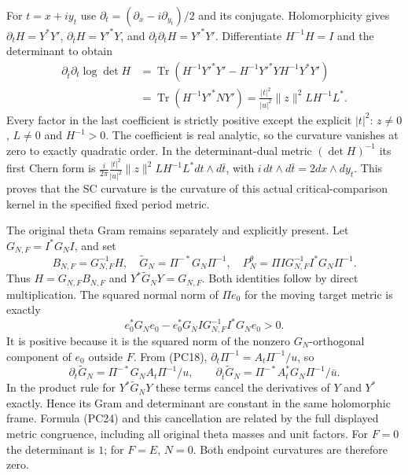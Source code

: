 For $t=x+iy_t$ use
$\partial_t=(\partial_x-i\partial_{y_t})/2$ and its conjugate.
Holomorphicity gives $\partial_tH=Y^*Y'$,
$\partial_{\bar t}H=Y'^*Y$, and
$\partial_{\bar t}\partial_tH=Y'^*Y'$.
Differentiate $H^{-1}H=I$ and the determinant to obtain
\[
\begin{split}
 \partial_{\bar t}\partial_t\log\det H
 &=\operatorname{Tr}(H^{-1}Y'^*Y'
     -H^{-1}Y'^*YH^{-1}Y^*Y')\\
 &=\operatorname{Tr}(H^{-1}Y'^*NY')
   =\frac{|t|^2}{|u|^2}\|z\|^2 L H^{-1}L^*.
\end{split}\tag{PC24}
\]
Every factor in the last coefficient is strictly positive except the
explicit $|t|^2$: $z\ne0$, $L\ne0$ and $H^{-1}>0$.
The coefficient is real analytic, so the curvature vanishes at zero
to exactly quadratic order.  In the determinant-dual metric
$(\det H)^{-1}$ its first Chern form is
$\frac{i}{2\pi}\frac{|t|^2}{|u|^2}\|z\|^2LH^{-1}L^*
dt\wedge d\bar t$, with $i\,dt\wedge d\bar t=2dx\wedge dy_t$.
This proves that the SC curvature is the curvature of this actual
critical-comparison kernel in the specified fixed period metric.

The original theta Gram remains separately and explicitly present.
Let $G_{N,F}=I^*G_NI$, and set
\[
 B_{N,F}=G_{N,F}^{-1}H,\quad
 \widetilde G_N=\Pi^{-*}G_N\Pi^{-1},\quad
 P_N^\theta=\Pi I G_{N,F}^{-1}I^*G_N\Pi^{-1}.
 \tag{PC25}
\]
Thus $H=G_{N,F}B_{N,F}$ and
$Y^*\widetilde G_NY=G_{N,F}$.  Both identities follow by direct
multiplication.  The squared normal norm of $\Pi e_0$ for the
moving target metric is exactly
\[
 e_0^*G_Ne_0-e_0^*G_NI G_{N,F}^{-1}I^*G_Ne_0>0.
 \tag{PC26}
\]
It is positive because it is the squared norm of the nonzero
$G_N$-orthogonal component of $e_0$ outside $F$.  From (PC18),
$\partial_t\Pi^{-1}=A_t\Pi^{-1}/u$, so
\[
 \partial_t\widetilde G_N=\Pi^{-*}G_NA_t\Pi^{-1}/u,
 \qquad
 \partial_{\bar t}\widetilde G_N=
       \Pi^{-*}A_t^*G_N\Pi^{-1}/\bar u.
 \tag{PC27}
\]
In the product rule for $Y^*\widetilde G_NY$ these terms cancel
the derivatives of $Y$ and $Y^*$ exactly.  Hence its Gram and
determinant are constant in the same holomorphic frame.  Formula
(PC24) and this cancellation are related by the full displayed
metric congruence, including all original theta masses and unit factors.
For $F=0$ the determinant is $1$; for $F=E$, $N=0$.
Both endpoint curvatures are therefore zero.



